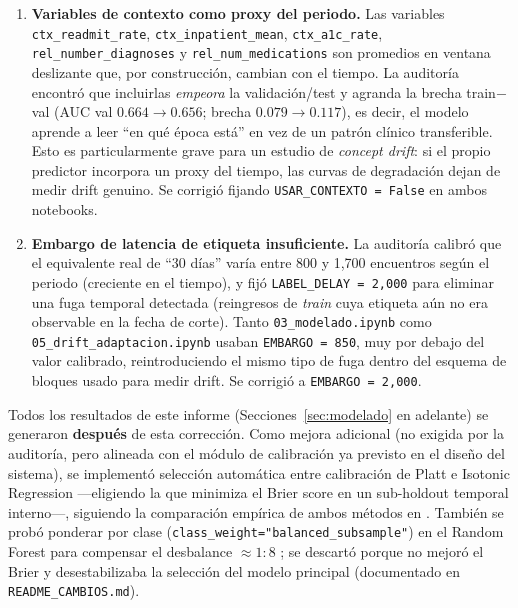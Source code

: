 \documentclass[11pt,a4paper]{article}
\begin{document}
\begin{enumerate}[leftmargin=*]
    \item \textbf{Variables de contexto como proxy del periodo.} Las variables \texttt{ctx\_readmit\_rate}, \texttt{ctx\_inpatient\_mean}, \texttt{ctx\_a1c\_rate}, \texttt{rel\_number\_diagnoses} y \texttt{rel\_num\_medications} son promedios en ventana deslizante que, por construcción, cambian con el tiempo. La auditoría encontró que incluirlas \emph{empeora} la validación/test y agranda la brecha train$-$val (AUC val $0.664 \rightarrow 0.656$; brecha $0.079\rightarrow0.117$), es decir, el modelo aprende a leer ``en qué época está'' en vez de un patrón clínico transferible. Esto es particularmente grave para un estudio de \emph{concept drift}: si el propio predictor incorpora un proxy del tiempo, las curvas de degradación dejan de medir drift genuino. Se corrigió fijando \texttt{USAR\_CONTEXTO = False} en ambos notebooks.
    \item \textbf{Embargo de latencia de etiqueta insuficiente.} La auditoría calibró que el equivalente real de ``30 días'' varía entre 800 y 1,700 encuentros según el periodo (creciente en el tiempo), y fijó \texttt{LABEL\_DELAY = 2{,}000} para eliminar una fuga temporal detectada (reingresos de \emph{train} cuya etiqueta aún no era observable en la fecha de corte). Tanto \texttt{03\_modelado.ipynb} como \texttt{05\_drift\_adaptacion.ipynb} usaban \texttt{EMBARGO = 850}, muy por debajo del valor calibrado, reintroduciendo el mismo tipo de fuga dentro del esquema de bloques usado para medir drift. Se corrigió a \texttt{EMBARGO = 2{,}000}.
\end{enumerate}

Todos los resultados de este informe (Secciones~\ref{sec:modelado} en adelante) se generaron \textbf{después} de esta corrección. Como mejora adicional (no exigida por la auditoría, pero alineada con el módulo de calibración ya previsto en el diseño del sistema), se implementó selección automática entre calibración de Platt \cite{platt1999} e Isotonic Regression \cite{zadrozny2002} —eligiendo la que minimiza el Brier score en un sub-holdout temporal interno—, siguiendo la comparación empírica de ambos métodos en \cite{niculescumizil2005}. También se probó ponderar por clase (\texttt{class\_weight="balanced\_subsample"}) en el Random Forest para compensar el desbalance $\approx 1{:}8$ \cite{chen2004}; se descartó porque no mejoró el Brier y desestabilizaba la selección del modelo principal (documentado en \texttt{README\_CAMBIOS.md}).
\end{document}
